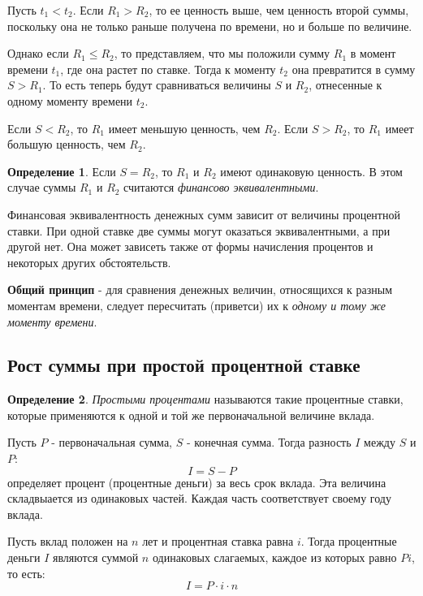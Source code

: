 \documentclass[aps,%
12pt,%
final,%
oneside,
onecolumn,%
musixtex, %
superscriptaddress,%
centertags]{article} %
\theoremstyle{plain}
\theoremstyle{definition}
\newtheorem{definition}{Определение}[subsection]
\theoremstyle{remark}
\begin{document}
Пусть $t_1 < t_2$. Если $R_1 > R_2$, то ее ценность выше, чем ценность второй суммы, поскольку она не только раньше получена по времени, но и больше по величине. 

Однако если $R_1 \leq R_2$, то представляем, что мы положили сумму $R_1$ в момент времени $t_1$, где она растет по ставке. Тогда к моменту $t_2$ она превратится в сумму $S>R_1$. То есть теперь будут сравниваться величины $S$ и $R_2$, отнесенные к одному моменту времени $t_2$. 

Если $S<R_2$, то $R_1$ имеет меньшую ценность, чем $R_2$. Если $S > R_2$, то  $R_1$ имеет большую ценность, чем $R_2$.


\begin{definition}
Если $S = R_2$, то $R_1$ и $R_2$ имеют одинаковую ценность. В этом случае суммы $R_1$ и $R_2$ считаются \textit{финансово эквивалентными}.
\end{definition}

Финансовая эквивалентность денежных сумм зависит от величины процентной ставки. При одной ставке две суммы могут оказаться эквивалентными, а при другой нет. Она может зависеть также от формы начисления процентов и некоторых других обстоятельств.

\textbf{Общий принцип} - для сравнения денежных величин, относящихся к разным моментам времени, следует пересчитать (приветси) их к \textit{одному и тому же моменту времени}.


\subsection{Рост суммы при простой процентной ставке}

\begin{definition}
\textit{Простыми процентами} называются такие процентные ставки, которые применяются к одной и той же первоначальной величине вклада.
\end{definition}

Пусть $P$ - первоначальная сумма, $S$ - конечная сумма. Тогда разность $I$ между $S$ и $P$:
$$I = S - P$$
определяет процент (процентные деньги) за весь срок вклада. Эта величина складвыается из одинаковых частей. Каждая часть соответствует своему году вклада.

Пусть вклад положен на $n$ лет и процентная ставка равна $i$. Тогда процентные деньги $I$ являются суммой $n$ одинаковых слагаемых, каждое из которых равно $Pi$, то есть:
$$I = P \cdot i \cdot n$$
\end{document}
